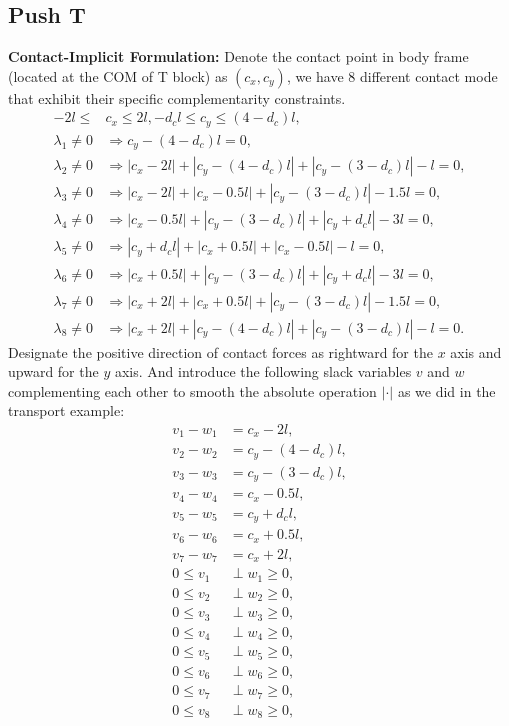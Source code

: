 \subsection{Push T}\label{app:formulation-pushT}
\textbf{Contact-Implicit Formulation:}
Denote the contact point in body frame (located at the COM of T block) as $(c_x,c_y)$, we have 8 different contact mode that exhibit their specific complementarity constraints.
\begin{align}
    -2l\leq &c_x \leq 2l, -d_cl \leq c_y \leq (4-d_c)l,\\
    \lambda_1 \neq 0 &\Rightarrow c_y - (4-d_c)l = 0,\\
    \lambda_2 \neq 0 &\Rightarrow |c_x - 2l| + |c_y-(4-d_c)l| + |c_y-(3-d_c)l| - l = 0,\\
    \lambda_3 \neq 0 &\Rightarrow |c_x - 2l| + |c_x-0.5l| + |c_y-(3-d_c)l| - 1.5l = 0,\\
    \lambda_4 \neq 0 &\Rightarrow |c_x-0.5l| + |c_y-(3-d_c)l| + |c_y + d_cl| - 3l = 0,\\
    \lambda_5 \neq 0 &\Rightarrow |c_y + d_cl| + |c_x + 0.5l| + |c_x - 0.5l| - l = 0,\\
    \lambda_6 \neq 0 &\Rightarrow |c_x + 0.5l| + |c_y-(3-d_c)l| + |c_y + d_cl| - 3l = 0,\\
    \lambda_7 \neq 0 &\Rightarrow |c_x + 2l| + |c_x+0.5l| + |c_y-(3-d_c)l| - 1.5l = 0,\\
    \lambda_8 \neq 0 &\Rightarrow |c_x + 2l| + |c_y-(4-d_c)l| + |c_y-(3-d_c)l| - l = 0.
\end{align}
Designate the positive direction of contact forces as rightward for the $x$
axis and upward for the $y$ axis. And introduce the following slack variables $v$ and $w$ complementing each other to smooth the absolute operation $|\cdot|$ as we did in the transport example:
\begin{align}
    v_1 - w_1 &= c_x -2l,\\
    v_2 - w_2 &= c_y -(4-d_c)l,\\
    v_3 - w_3 &= c_y -(3-d_c)l,\\
    v_4 - w_4 &= c_x -0.5l,\\
    v_5 - w_5 &= c_y + d_cl,\\
    v_6 - w_6 &= c_x + 0.5l,\\
    v_7 - w_7 &= c_x + 2l,\\
    0 \leq v_1 &\perp w_1 \geq 0,\\
    0 \leq v_2 &\perp w_2 \geq 0,\\
    0 \leq v_3 &\perp w_3 \geq 0,\\
    0 \leq v_4 &\perp w_4 \geq 0,\\
    0 \leq v_5 &\perp w_5 \geq 0,\\
    0 \leq v_6 &\perp w_6 \geq 0,\\
    0 \leq v_7 &\perp w_7 \geq 0,\\
    0 \leq v_8 &\perp w_8 \geq 0,
\end{align}
